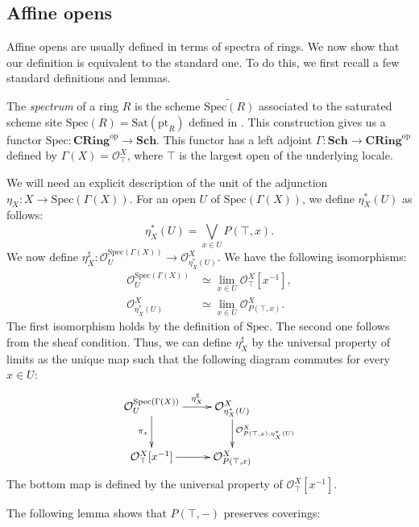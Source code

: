 \documentclass[reqno]{amsart}
\theoremstyle{definition}
\theoremstyle{remark}
\numberwithin{figure}{section}
\newcommand{\cat}[1]{\mathbf{#1}}
\begin{document}
\subsection{Affine opens}
\label{sec:affine-opens}

Affine opens are usually defined in terms of spectra of rings.
We now show that our definition is equivalent to the standard one.
To do this, we first recall a few standard definitions and lemmas.

The \emph{spectrum} of a ring $R$ is the scheme $\widetilde{\mathrm{Spec}(R)}$ associated to the saturated scheme site $\mathrm{Spec}(R) = \mathrm{Sat}(\mathrm{pt}_R)$ defined in .
This construction gives us a functor $\mathrm{Spec} : \cat{CRing}^{\mathrm{op}} \to \cat{Sch}$.
This functor has a left adjoint $\Gamma : \cat{Sch} \to \cat{CRing}^{\mathrm{op}}$ defined by $\Gamma(X) = \mathcal{O}^X_\top$,
where $\top$ is the largest open of the underlying locale.

We will need an explicit description of the unit of the adjunction $\eta_X : X \to \mathrm{Spec}(\Gamma(X))$.
For an open $U$ of $\mathrm{Spec}(\Gamma(X))$, we define $\eta_X^*(U)$ as follows:
\[ \eta_X^*(U) = \bigvee_{x \in U} P(\top,x). \]
We now define $\eta_X^\sharp : \mathcal{O}^{\mathrm{Spec}(\Gamma(X))}_U \to \mathcal{O}^X_{\eta_X^*(U)}$.
We have the following isomorphisms:
\begin{align*}
\mathcal{O}^{\mathrm{Spec}(\Gamma(X))}_U & \simeq \lim_{x \in U} \mathcal{O}^X_\top[x^{-1}], \\
\mathcal{O}^X_{\eta_X^*(U)} & \simeq \lim_{x \in U} \mathcal{O}^X_{P(\top,x)}.
\end{align*}
The first isomorphism holds by the definition of $\mathrm{Spec}$.
The second one follows from the sheaf condition.
Thus, we can define $\eta_X^\sharp$ by the universal property of limits as the unique map such that the following diagram commutes for every $x \in U$:
\[ \xymatrix{ \mathcal{O}^{\mathrm{Spec}(\Gamma(X))}_U \ar[r]^-{\eta_X^\sharp} \ar[d]_{\pi_x} & \mathcal{O}^X_{\eta_X^*(U)} \ar[d]^{\mathcal{O}^X_{P(\top,x), \eta_X^*(U)}} \\
              \mathcal{O}^X_\top[x^{-1}] \ar[r] & \mathcal{O}^X_{P(\top,x)}
            } \]
The bottom map is defined by the universal property of $\mathcal{O}^X_\top[x^{-1}]$.

The following lemma shows that $P(\top,-)$ preserves coverings:
\end{document}
